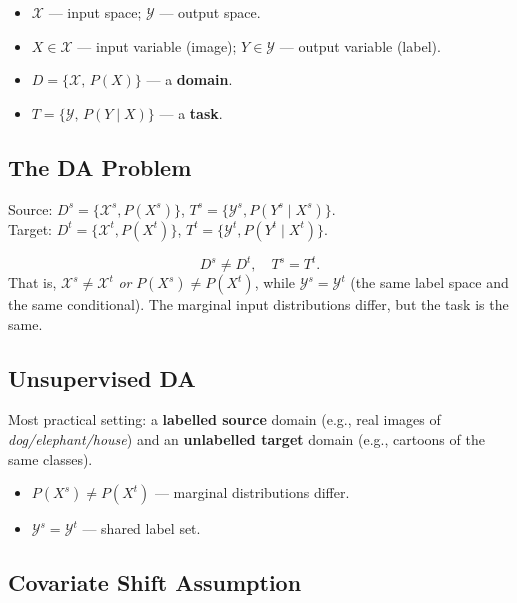 \documentclass[11pt,a4paper]{article}
\theoremstyle{definition}
\theoremstyle{plain}
\theoremstyle{remark}
\begin{document}
\begin{itemize}
    \item $\mathcal{X}$ --- input space; $\mathcal{Y}$ --- output space.
    \item $X \in \mathcal{X}$ --- input variable (image); $Y \in \mathcal{Y}$ --- output variable (label).
    \item $D = \{\mathcal{X},\, P(X)\}$ --- a \textbf{domain}.
    \item $T = \{\mathcal{Y},\, P(Y\mid X)\}$ --- a \textbf{task}.
\end{itemize}

\subsection{The DA Problem}

Source: $D^s = \{\mathcal{X}^s, P(X^s)\}$, $T^s = \{\mathcal{Y}^s, P(Y^s\mid X^s)\}$.\\
Target: $D^t = \{\mathcal{X}^t, P(X^t)\}$, $T^t = \{\mathcal{Y}^t, P(Y^t\mid X^t)\}$.

\begin{tcolorbox}[colback=green!5!white,colframe=green!60!black,title=\textbf{Domain Adaptation}]
\begin{equation*}
    D^s \neq D^t, \quad T^s = T^t.
\end{equation*}
That is, $\mathcal{X}^s \neq \mathcal{X}^t$ \emph{or} $P(X^s) \neq P(X^t)$, while $\mathcal{Y}^s = \mathcal{Y}^t$ (the same label space and the same conditional). The marginal input distributions differ, but the task is the same.
\end{tcolorbox}

\subsection{Unsupervised DA}

Most practical setting: a \textbf{labelled source} domain (e.g., real images of \emph{dog/elephant/house}) and an \textbf{unlabelled target} domain (e.g., cartoons of the same classes).

\begin{itemize}
    \item $P(X^s) \neq P(X^t)$ --- marginal distributions differ.
    \item $\mathcal{Y}^s = \mathcal{Y}^t$ --- shared label set.
\end{itemize}

\subsection{Covariate Shift Assumption}
\end{document}
